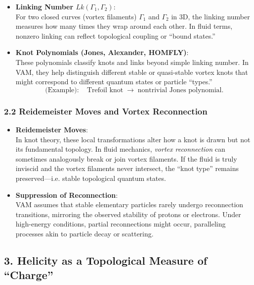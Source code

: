 \begin{itemize}
    \item \textbf{Linking Number \(Lk(\Gamma_1, \Gamma_2)\)}: \\
    For two closed curves (vortex filaments) \(\Gamma_1\) and \(\Gamma_2\) in 3D, the linking number measures how many times they wrap around each other. In fluid terms, nonzero linking can reflect topological coupling or “bound states.”
    \item \textbf{Knot Polynomials (Jones, Alexander, HOMFLY)}: \\
    These polynomials classify knots and links beyond simple linking number. In VAM, they help distinguish different stable or quasi-stable vortex knots that might correspond to different quantum states or particle “types.”
    \[
        \text{(Example)}:\quad
        \text{Trefoil knot}\;\longrightarrow\;\text{nontrivial Jones polynomial.}
    \]
\end{itemize}

\subsubsection*{2.2 Reidemeister Moves and Vortex Reconnection}

\begin{itemize}
    \item \textbf{Reidemeister Moves}: \\
    In knot theory, these local transformations alter how a knot is drawn but not its fundamental topology. In fluid mechanics, \textit{vortex reconnection} can sometimes analogously break or join vortex filaments. If the fluid is truly inviscid and the vortex filaments never intersect, the “knot type” remains preserved—i.e. stable topological quantum states.
    \item \textbf{Suppression of Reconnection}: \\
    VAM assumes that stable elementary particles rarely undergo reconnection transitions, mirroring the observed stability of protons or electrons. Under high-energy conditions, partial reconnections might occur, paralleling processes akin to particle decay or scattering.
\end{itemize}

\subsection*{3. Helicity as a Topological Measure of “Charge”}


